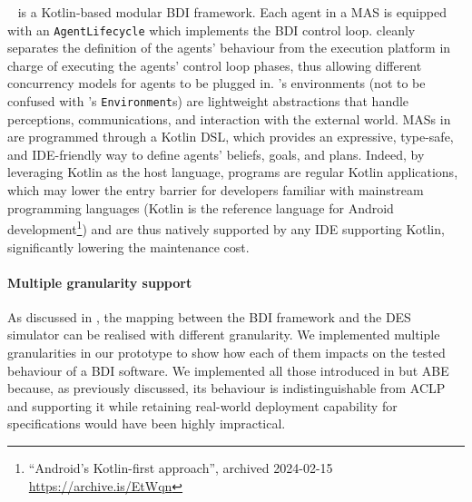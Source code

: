 \jakta{}~\cite{SNCS:JaktaJournal} is a Kotlin-based modular \ac{BDI} framework.
%
Each agent in a \jakta{} \ac{MAS} is equipped with an \texttt{AgentLifecycle} which implements the \ac{BDI} control loop.
%
\jakta{} cleanly separates the definition of the agents' behaviour from the execution platform
in charge of executing the agents' control loop phases,
thus allowing different concurrency models for agents to be plugged in.
%
\jakta's environments (not to be confused with \alchemist{}'s \texttt{Environment}s)
are lightweight abstractions that handle
perceptions, communications, and interaction with the external world.
%
\acp{MAS} in \jakta{} are programmed through a Kotlin \ac{DSL},
which provides an expressive, type-safe, and
\ac{IDE}-friendly way to define agents' beliefs, goals, and plans.
%
Indeed, by leveraging Kotlin as the host language,
\jakta{} programs are regular Kotlin applications,
which may lower the entry barrier for developers familiar with mainstream programming languages
(Kotlin is the reference language for Android development\footnote{
    ``Android’s Kotlin-first approach'', archived 2024-02-15 \url{https://archive.is/EtWqn}
})
and are thus natively supported by any \ac{IDE} supporting Kotlin,
significantly lowering the maintenance cost.

\paragraph{Multiple granularity support}

As discussed in ,
the mapping between the \ac{BDI} framework and the \ac{DES} simulator
can be realised with different granularity.
%
We implemented multiple granularities in our prototype
to show how each of them
impacts on the tested behaviour of a \ac{BDI} software.
%
We implemented all those introduced in  but \ac{ABE} because,
as previously discussed,
its behaviour is indistinguishable from \ac{ACLP}
and supporting it
while retaining real-world deployment capability for \jakta{} specifications
would have been highly impractical\footnotemark.
%

